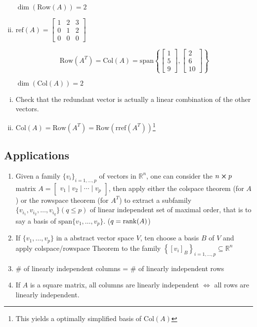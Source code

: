 \begin{sol}
\begin{enumerate}[i)]
		$\dim(\mathrm{Row}(A)) = 2$

		\item $\mathrm{ref}(A) = \begin{bmatrix}
			1&2&3\\
			0&1&2\\
			0&0&0
		\end{bmatrix}$

		\[\mathrm{Row}(A^T) = \mathrm{Col}(A) = \mathrm{span}\left\{
			\begin{bmatrix}
				1\\5\\9
			\end{bmatrix}, \begin{bmatrix}
				2\\6\\10
			\end{bmatrix}
		\right\}\]

		$\dim(\mathrm{Col}(A)) = 2$
	\end{enumerate}
\end{sol}

\begin{remark}
	\begin{enumerate}[i)]
		\item Check that the redundant vector is actually a linear combination of the other vectors.
		\item $\mathrm{Col}(A) = \mathrm{Row}(A^T) = \mathrm{Row}(\mathrm{rref}(A^T))$\footnote{This yields a optimally simplified basis of $\mathrm{Col}(A)$}
	\end{enumerate}
\end{remark}

\subsection{Applications}

\begin{enumerate}
	\item Given a family $\{v_i\}_{i = 1,\ldots, p}$ of vectors in $\mathbb{R}^n$, one can consider the $n \cross p$ matrix $A = \begin{bmatrix}
		v_1 \mid v_2 \mid \cdots \mid v_p
	\end{bmatrix}$, then apply either the colspace theorem (for $A$) or the rowspace theorem (for $A^T$) to extract a subfamily $\{v_{i_1}, v_{i_2}, \ldots, v_{i_q}\} (q \leq p)$ of linear independent set of maximal order, that is to say a basis of $\mathrm{span}\{v_1, \ldots, v_p\}$. ($q = \rank(A)$)

	\item If $\{v_1, \ldots, v_p\}$ in a abstract vector space $V$, ten choose a basis $B$ of $V$ and apply colspace/rowspace Theorem to the family $\left\{[v_i]_B\right\}_{i=1,\ldots,p} \subseteq \mathbb{R}^n$
	\item \# of linearly independent columns = \# of linearly independent rows
	\item If $A$ is a square matrix, all columns are linearly independent $\iff$ all rows are linearly independent.
\end{enumerate}

